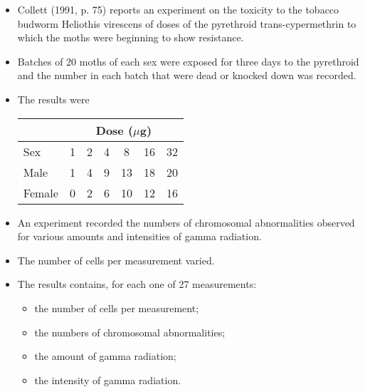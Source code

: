 \begin{frame}
  \begin{itemize}
    \item Collett (1991, p. 75) reports an experiment on the toxicity to the tobacco budworm Heliothis virescens of doses of the pyrethroid trans-cypermethrin to which the moths were beginning to show resistance. 
    \item Batches of 20 moths of each sex were exposed for three days to the pyrethroid and the number in each batch that were dead or knocked down was recorded.
    \item The results were\\
      \begin{center}
        \begin{tabular}{lcccccc}
          \hline
          & \multicolumn{6}{c}{Dose ($\mu$g)} \\
          \hline
          Sex & 1&2&4&8&16&32\\
          \hline
          Male&1&4&9&13&18&20\\
          Female&0&2&6&10&12&16\\
          \hline
        \end{tabular}        
      \end{center}
  \end{itemize}
\end{frame}




\begin{frame}
  \begin{itemize}
    \vspace{0.5cm}
    \item An experiment recorded the numbers of chromosomal abnormalities observed for various amounts and intensities of gamma radiation.
    \vspace{0.5cm}
    \item The number of cells per measurement varied.
    \vspace{0.5cm}
    \item The results contains, for each one of 27 measurements:
      \begin{itemize}
        \item the number of cells per measurement;
        \vspace{0.25cm}
        \item the numbers of chromosomal abnormalities;
        \vspace{0.25cm}
        \item the amount of gamma radiation;
        \vspace{0.25cm}
        \item the intensity of gamma radiation.   
      \end{itemize}
  \end{itemize}
\end{frame}



